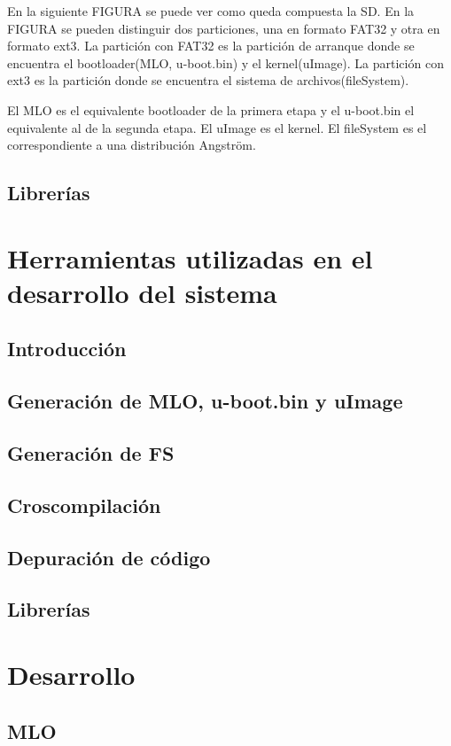 En la siguiente FIGURA se puede ver como queda compuesta la SD.
En la FIGURA se pueden distinguir dos particiones, una en formato FAT32 y otra en formato ext3.
La partición con FAT32 es la partición de arranque donde se encuentra el bootloader(MLO, u-boot.bin) y el kernel(uImage).
La partición con ext3 es la partición donde se encuentra el sistema de archivos(fileSystem).

El MLO es el equivalente bootloader de la primera etapa y el u-boot.bin el equivalente al de la segunda etapa.
El uImage es el kernel.
El fileSystem es el correspondiente a una distribución Angström.

\subsection{Librerías}

\section{Herramientas utilizadas en el desarrollo del sistema}
\subsection{Introducción}
\subsection{Generación de MLO, u-boot.bin y uImage}
\subsection{Generación de FS}
\subsection{Croscompilación}
\subsection{Depuración de código}
\subsection{Librerías}

\section{Desarrollo}
\subsection{MLO}

